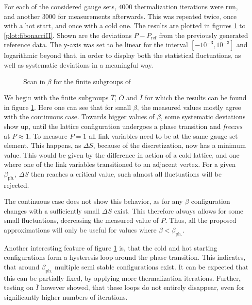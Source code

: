 For each of the considered gauge sets, $4000$ thermalization iterations were run, and another $3000$ for measurements afterwards. This was repeated twice, once with a hot start, and once with a cold one. The results are plotted in figures \ref{plot:subgroups} to \ref{plot:fibonacciII}. Shown are the deviations $P - P_{\textrm{ref}}$ from the previously generated reference data. The y-axis was set to be linear for the interval $[-10^{-3},10^{-3}]$ and logarithmic beyond that, in order to display both the statistical fluctuations, as well as systematic deviations in a meaningful way.\\
\begin{figure}[!hbt]
 \centering
 
 \caption{Scan in $\beta$ for the finite subgroups of \SUTwo}
 \label{plot:subgroups}
\end{figure}

We begin with the finite subgroups $\overline{T}$, $\overline{O}$ and $\overline{I}$ for which the results can be found in figure \ref{plot:subgroups}. Here one can see that for small $\beta$, the measured values mostly agree with the continuous case. Towards bigger values of $\beta$, some systematic deviations show up, until the lattice configuration undergoes a phase transition and \emph{freezes} at $P\approx1$. To measure $P=1$ all link variables need to be at the same gauge set element. This happens, as  $\Delta S$, because of the discretization, now has a minimum value. This would be given by the difference in action of a cold lattice, and one where one of the link variables transitioned to an adjacent vertex. For a given $\beta_{\textrm{ph.}}$, $\Delta S$ then reaches a critical value, such almost all fluctuations will be rejected.

The continuous case does not show this behavior, as for any $\beta$ configuration changes with a sufficiently small $\Delta S$ exist. This therefore always allows for some small fluctuations, decreasing the measured value of $P$. Thus, all the proposed approximations will only be useful for values where $\beta < \beta_{\textrm{ph.}}$.

Another interesting feature of figure \ref{plot:subgroups} is, that the cold and hot starting configurations form a hysteresis loop around the phase transition. This indicates, that around $\beta_{\textrm{ph.}}$ multiple semi stable configurations exist. It can be expected that this can be partially fixed, by applying more thermalization iterations. Further, testing on $\overline{I}$ however showed, that these loops do not entirely disappear, even for significantly higher numbers of iterations.

